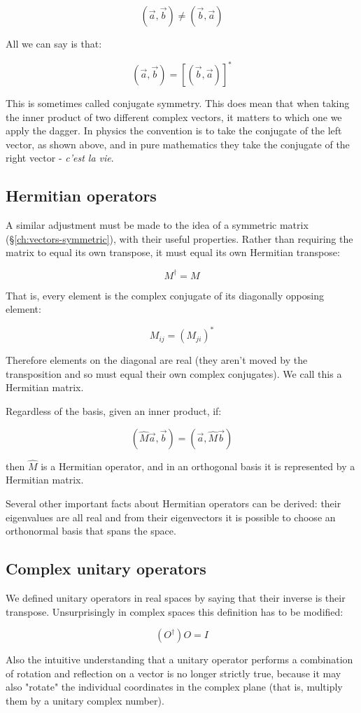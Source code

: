 $$
(\vec{a}, \vec{b})
\ne
(\vec{b}, \vec{a})
$$

All we can say is that:

$$
(\vec{a}, \vec{b})
=
\left[ (\vec{b}, \vec{a}) \right]^*
$$

This is sometimes called conjugate symmetry. This does mean that when taking the inner product of two different complex vectors, it matters to which one we apply the dagger. In physics the convention is to take the conjugate of the left vector, as shown above, and in pure mathematics they take the conjugate of the right vector - \textit{c'est la vie}.

\subsection{Hermitian operators}

A similar adjustment must be made to the idea of a symmetric matrix (§\ref{ch:vectors-symmetric}), with their useful properties. Rather than requiring the matrix to equal its own transpose, it must equal its own Hermitian transpose:

$$M^\dagger = M$$

That is, every element is the complex conjugate of its diagonally opposing element:

$$M_{ij} = (M_{ji})^*$$

Therefore elements on the diagonal are real (they aren't moved by the transposition and so must equal their own complex conjugates). We call this a Hermitian matrix.

Regardless of the basis, given an inner product, if:

$$(\hat{M} \vec{a}, \vec{b}) = (\vec{a}, \hat{M} \vec{b})$$

then $\hat{M}$ is a Hermitian operator, and in an orthogonal basis it is represented by a Hermitian matrix.

Several other important facts about Hermitian operators can be derived: their eigenvalues are all real and from their eigenvectors it is possible to choose an orthonormal basis that spans the space.

\subsection{Complex unitary operators}

We defined unitary operators in real spaces by saying that their inverse is their transpose. Unsurprisingly in complex spaces this definition has to be modified:

$$(O^\dagger) O = I$$

Also the intuitive understanding that a unitary operator performs a combination of rotation and reflection on a vector is no longer strictly true, because it may also "rotate" the individual coordinates in the complex plane (that is, multiply them by a unitary complex number).